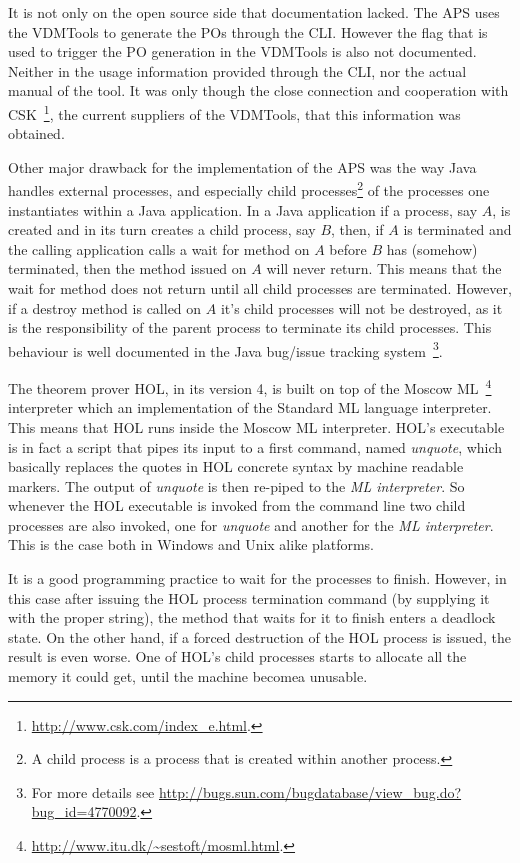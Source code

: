 \documentclass[]{article}
\begin{document}
It is not only on the open source side that documentation lacked. 
The APS uses the VDMTools to generate the POs through the CLI.
However the flag that is used to trigger the PO generation in the VDMTools is also not documented.
Neither in the usage information provided through the CLI, nor the actual manual of the tool.
It was only though the close connection and cooperation with CSK~\footnote{\url{http://www.csk.com/index_e.html}.}, the current suppliers of the VDMTools, that this information was obtained.

Other major drawback for the implementation of the APS was the way Java handles external processes, and especially child processes\footnote{A child process is a process that is created within another process.} of the processes one instantiates within a Java application.
In a Java application if a process, say $A$, is created and in its turn creates a child process, say $B$, then, if $A$ is terminated and the calling application calls a wait for method on $A$ before $B$ has (somehow) terminated, then the method issued on $A$ will never return.
This means that the wait for method does not return until all child processes are terminated.
However, if a destroy method is called on $A$ it's child processes will not be destroyed, as it is the responsibility of the parent process to terminate its child processes.
This behaviour is well documented in the Java bug/issue tracking system~\footnote{For more details see \url{http://bugs.sun.com/bugdatabase/view_bug.do?bug_id=4770092}.}.

The theorem prover HOL, in its version 4, is built on top of the Moscow ML~\footnote{\url{http://www.itu.dk/~sestoft/mosml.html}.} interpreter which an implementation of the Standard ML language interpreter.
This means that HOL runs inside the Moscow ML interpreter.
HOL's executable is in fact a script that pipes its input to a first command, named \emph{unquote}, which basically replaces the quotes in HOL concrete syntax by machine readable markers.
The output of \emph{unquote} is then re-piped to the \emph{ML interpreter}.
So whenever the HOL executable is invoked from the command line two child processes are also invoked, one for \emph{unquote} and another for the \emph{ML interpreter}.
This is the case both in Windows and Unix alike platforms.

It is a good programming practice to wait for the processes to finish.
However, in this case after issuing the HOL process termination command (by supplying it with the proper string), the method that waits for it to finish enters a deadlock state.
On the other hand, if a forced destruction of the HOL process is issued, the result is even worse.
One of HOL's child processes starts to allocate all the memory it could get, until the machine becomea unusable.
\end{document}
